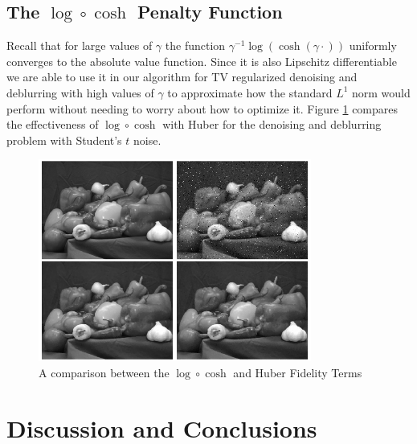 \documentclass[10pt,a4paper]{article}
\begin{document}
	\subsection{The $\log \circ \cosh$ Penalty Function}
	
	Recall that for large values of $\gamma$ the function $\gamma^{-1} \log(\cosh (\gamma \cdot ))$ uniformly converges to the absolute value function.  Since it is also Lipschitz differentiable we are able to use it in our algorithm for TV regularized denoising and deblurring with high values of $\gamma$ to approximate how the standard $L^1$ norm would perform without needing to worry about how to optimize it.  Figure \ref{log_cosh_pic}
compares the effectiveness of $\log \circ \cosh$ with Huber for the denoising and deblurring problem with Student's $t$ noise.
	
	\begin{figure}[H]
		\begin{center}
			\includegraphics[width=0.8\textwidth]{../figures/logcosh_peppers.png}
			\caption{A comparison between the $\log \circ \cosh$ and Huber Fidelity Terms }
			\label{log_cosh_pic}
		\end{center}
	\end{figure}
	
	\section{Discussion and Conclusions}
	
\end{document}
